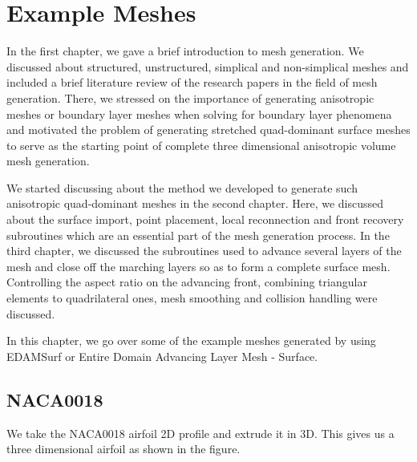 \chapter{Example Meshes}

In the first chapter, we gave a brief introduction to mesh generation. We discussed about structured, unstructured, simplical and non-simplical meshes and included a brief literature review of the research papers in the field of mesh generation. There, we stressed on the importance of generating anisotropic meshes or boundary layer meshes when solving for boundary layer phenomena and motivated the problem of generating stretched quad-dominant surface meshes to serve as the starting point of complete three dimensional anisotropic volume mesh generation.

We started discussing about the method we developed to generate such anisotropic quad-dominant meshes in the second chapter. Here, we discussed about the surface import, point placement, local reconnection and front recovery subroutines which are an essential part of the mesh generation process. In the third chapter, we discussed the subroutines used to advance several layers of the mesh and close off the marching layers so as to form a complete surface mesh. Controlling the aspect ratio on the advancing front, combining triangular elements to quadrilateral ones, mesh smoothing and collision handling were discussed.

In this chapter, we go over some of the example meshes generated by using EDAMSurf or Entire Domain Advancing Layer Mesh - Surface.

\section{NACA0018}

We take the NACA0018 airfoil 2D profile and extrude it in 3D. This gives us a three dimensional airfoil as shown in the figure.